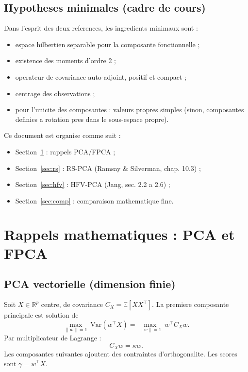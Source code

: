 \documentclass[11pt,a4paper]{article}
\begin{document}
\subsection{Hypotheses minimales (cadre de cours)}
\label{subsec:hyp-min}

Dans l'esprit des deux references, les ingredients minimaux sont :
\begin{itemize}[leftmargin=1.5em]
  \item espace hilbertien separable pour la composante fonctionnelle ;
  \item existence des moments d'ordre 2 ;
  \item operateur de covariance auto-adjoint, positif et compact ;
  \item centrage des observations ;
  \item pour l'unicite des composantes : valeurs propres simples
  (sinon, composantes definies a rotation pres dans le sous-espace propre).
\end{itemize}

Ce document est organise comme suit :
\begin{itemize}[leftmargin=1.5em]
  \item Section~\ref{sec:rappels} : rappels PCA/FPCA ;
  \item Section~\ref{sec:rs} : RS-PCA (Ramsay \& Silverman, chap. 10.3) ;
  \item Section~\ref{sec:hfv} : HFV-PCA (Jang, sec. 2.2 a 2.6) ;
  \item Section~\ref{sec:comp} : comparaison mathematique fine.
\end{itemize}

\section{Rappels mathematiques : PCA et FPCA}
\label{sec:rappels}

\subsection{PCA vectorielle (dimension finie)}

Soit $X\in\mathbb{R}^p$ centre, de covariance
$C_X=\mathbb{E}[XX^\top]$. La premiere composante principale est solution de
\[
\max_{\|w\|=1}\ \mathrm{Var}(w^\top X)=\max_{\|w\|=1}\ w^\top C_X w.
\]
Par multiplicateur de Lagrange :
\[
C_Xw=\kappa w.
\]
Les composantes suivantes ajoutent des contraintes d'orthogonalite. Les scores
sont $\gamma=w^\top X$.
\end{document}
